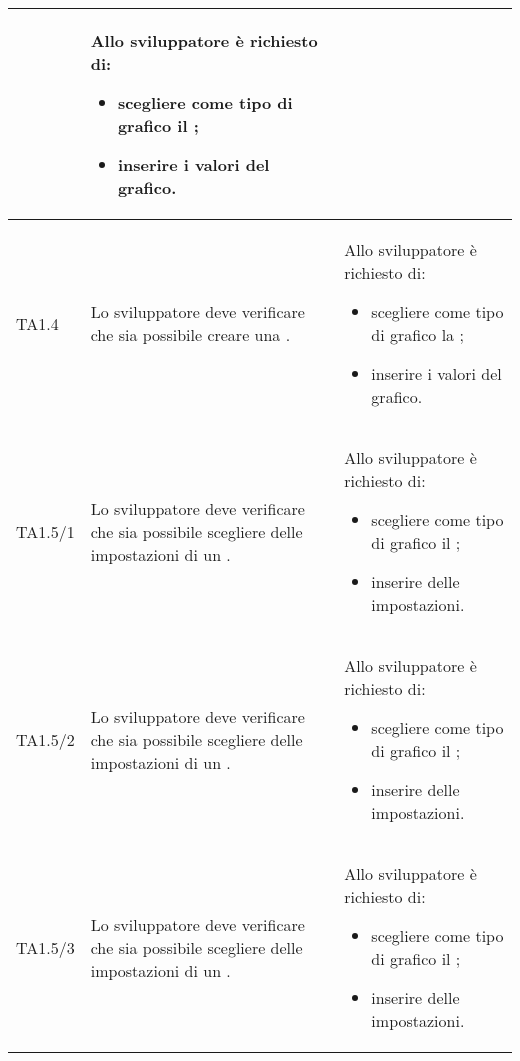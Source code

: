 \begin{longtabu}{| X[0.5] | X | X |}
		& Allo sviluppatore è richiesto di:
		\begin{itemize}
			\item scegliere come tipo di grafico il ;
			\item inserire i valori del grafico.
		\end{itemize}
\\ \hline

	TA1.4 & Lo sviluppatore deve verificare che sia possibile creare una .

		& Allo sviluppatore è richiesto di:
		\begin{itemize}
			\item scegliere come tipo di grafico la ;
			\item inserire i valori del grafico.
		\end{itemize}
\\ \hline

	TA1.5/1 & Lo sviluppatore deve verificare che sia possibile scegliere delle impostazioni di un .

		& Allo sviluppatore è richiesto di:
		\begin{itemize}
			\item scegliere come tipo di grafico il ;
			\item inserire delle impostazioni.
		\end{itemize}
\\ \hline

	TA1.5/2 & Lo sviluppatore deve verificare che sia possibile scegliere delle impostazioni di un .

		& Allo sviluppatore è richiesto di:
		\begin{itemize}
			\item scegliere come tipo di grafico il ;
			\item inserire delle impostazioni.
		\end{itemize}
\\ \hline

	TA1.5/3 & Lo sviluppatore deve verificare che sia possibile scegliere delle impostazioni di un .

		& Allo sviluppatore è richiesto di:
		\begin{itemize}
			\item scegliere come tipo di grafico il ;
			\item inserire delle impostazioni.
		\end{itemize}
\\ \hline


\end{longtabu}
